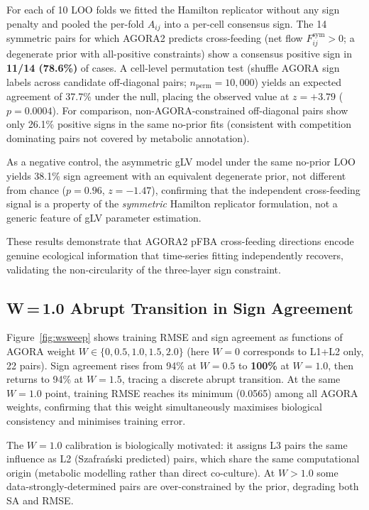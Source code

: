 \documentclass[11pt,a4paper]{article}
\begin{document}
For each of 10 LOO folds we fitted the Hamilton replicator without any sign penalty and pooled the per-fold $A_{ij}$ into a per-cell consensus sign.
The 14 symmetric pairs for which AGORA2 predicts cross-feeding (net flow $F^\mathrm{sym}_{ij}{>}0$; a degenerate prior with all-positive constraints) show a consensus positive sign in \textbf{11/14 (78.6\%)} of cases.
A cell-level permutation test (shuffle AGORA sign labels across candidate off-diagonal pairs; $n_\mathrm{perm}{=}10{,}000$) yields an expected agreement of 37.7\% under the null, placing the observed value at $z{=}{+}3.79$ ($p{=}0.0004$).
For comparison, non-AGORA-constrained off-diagonal pairs show only 26.1\% positive signs in the same no-prior fits (consistent with competition dominating pairs not covered by metabolic annotation).

As a negative control, the asymmetric gLV model under the same no-prior LOO yields 38.1\% sign agreement with an equivalent degenerate prior, not different from chance ($p{=}0.96$, $z{=}{-}1.47$), confirming that the independent cross-feeding signal is a property of the \emph{symmetric} Hamilton replicator formulation, not a generic feature of gLV parameter estimation.

These results demonstrate that AGORA2 pFBA cross-feeding directions encode genuine ecological information that time-series fitting independently recovers, validating the non-circularity of the three-layer sign constraint.

\subsection{W\,=\,1.0 Abrupt Transition in Sign Agreement}
\label{ssec:wSweep}

Figure~\ref{fig:wsweep} shows training RMSE and sign agreement as functions
of AGORA weight $W \in \{0, 0.5, 1.0, 1.5, 2.0\}$ (here $W{=}0$ corresponds
to L1+L2 only, 22 pairs).
Sign agreement rises from 94\% at $W{=}0.5$ to \textbf{100\%} at $W{=}1.0$,
then returns to 94\% at $W{=}1.5$, tracing a discrete abrupt transition.
At the same $W{=}1.0$ point, training RMSE reaches its minimum (0.0565)
among all AGORA weights, confirming that this weight simultaneously maximises
biological consistency and minimises training error.

The $W{=}1.0$ calibration is biologically motivated: it assigns L3 pairs the
same influence as L2 (Szafra\'{n}ski predicted) pairs, which share the same
computational origin (metabolic modelling rather than direct co-culture).
At $W{>}1.0$ some data-strongly-determined pairs are over-constrained by the
prior, degrading both SA and RMSE.
\end{document}
